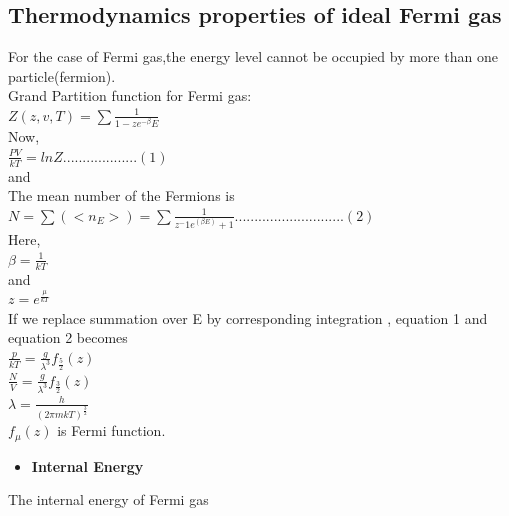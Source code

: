 \documentclass{article}
\newcommand*{\1}{\hspace{1pt}}
\begin{document}
\subsection{\textbf{Thermodynamics properties of ideal Fermi gas}} 

For the case of Fermi gas,the energy level cannot be occupied by more than one particle(fermion).\\

Grand Partition function for Fermi gas:\\

$Z(z,v,T)=\sum\frac{1}{1-ze^{-\beta}E}$\\

Now,\\

$\frac{PV}{kT}=lnZ ...  ...  ...  ..........(1)$\\

and\\

The mean number of the Fermions is\\

$N=\sum(<n_E>)=\sum\frac{1}{z^-1e^(\beta E)+1}............................(2)$\\

Here,\\

$\beta=\frac{1}{kT}$\\

and\\

$z=e^{\frac{\mu}{kT}}$\\

If we replace summation over E by corresponding integration , equation 1 and equation 2 becomes\\

$\frac{p}{kT}=\frac{g}{\lambda^3}f_\frac{5}{2}(z)$\\

$\frac{N}{V}=\frac{g}{\lambda^3}f_\frac{3}{2}(z)$\\

$\lambda =\frac{h}{(2\pi mkT)^{\frac{3}{2}}}$\\

$f_\mu(z)$ is Fermi function.\\


\begin{itemize}
    \item \textbf{Internal Energy}
\end{itemize}

The internal energy of Fermi gas\\
\end{document}
